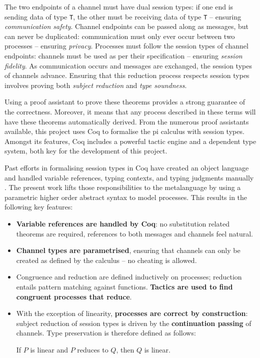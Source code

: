 \documentclass{mproj}
\begin{document}
The two endpoints of a channel must have dual session types: if one end is
sending data of type \texttt{T}, the other must be receiving data of type
\texttt{T} -- ensuring \textit{communication safety}. Channel endpoints can be
passed along as messages, but can never be duplicated: communication must only
ever occur between two processes -- ensuring \textit{privacy}.  Processes must
follow the session types of channel endpoints: channels must be used as per
their specification -- ensuring \textit{session fidelity}. As communication
occurs and messages are exchanged, the session types of channels advance.
Ensuring that this reduction process respects session types involves proving
both \textit{subject reduction} and \textit{type soundness}. \cite{Dardha2016m}

Using a proof assistant to prove these theorems provides a strong guarantee of
the correctness. Moreover, it means that any process described in these terms
will have these theorems automatically derived. From the numerous proof
assistants available, this project uses Coq to formalise the pi calculus with
session types. Amongst its features, Coq includes a powerful tactic engine and a
dependent type system, both key for the development of this project.

Past efforts in formalising session types in Coq have created an object language
and handled variable references, typing contexts, and typing judgments manually
\cite{Dilmore2019}. The present work lifts those responsibilities to the
metalanguage by using a parametric higher order abstract syntax to model
processes. This results in the following key features:

\begin{itemize}
    \item \textbf{Variable references are handled by Coq}: no substitution
        related theorems are required, references to both messages and channels
        feel natural.
    \item \textbf{Channel types are parametrised}, ensuring that channels can
        only be created as defined by the calculus -- no cheating is allowed.
    \item Congruence and reduction are defined inductively on processes;
        reduction entails pattern matching against functions. \textbf{Tactics
        are used to find congruent processes that reduce}.
    \item With the exception of linearity, \textbf{processes are correct by
        construction}: subject reduction of session types is driven by the
        \textbf{continuation passing} of channels. Type preservation is
        therefore defined as follows:
        
    \centering
        If $P$ is linear and $P$ reduces to $Q$, then $Q$ is linear.
\end{itemize}




\end{document}
